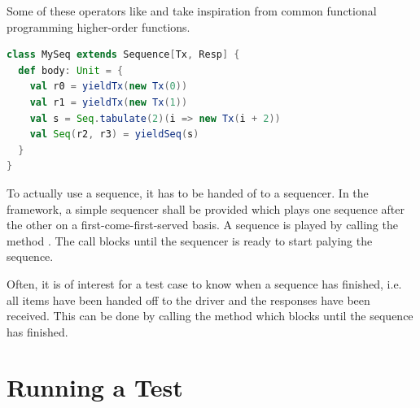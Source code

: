 Some of these operators like  and  take inspiration from common functional programming
higher-order functions.

\begin{listing}
\begin{lstlisting}[language=scala, captionpos=b, caption=Example of a sequence producing four items of type \ttt{Tx} with responses of type \ttt{Resp}.,label=lst:sequence]
class MySeq extends Sequence[Tx, Resp] {
  def body: Unit = {
    val r0 = yieldTx(new Tx(0))
    val r1 = yieldTx(new Tx(1))
    val s = Seq.tabulate(2)(i => new Tx(i + 2))
    val Seq(r2, r3) = yieldSeq(s)
  }
}
\end{lstlisting}
\end{listing}

To actually use a sequence, it has to be handed of to a sequencer. In the framework, a simple sequencer shall be
provided which plays one sequence after the other on a first-come-first-served basis. A sequence is played by calling
the method . The call blocks until the sequencer is ready to start palying the sequence.

Often, it is of interest for a test case to know when a sequence has finished, i.e. all items have been handed off to
the driver and the responses have been received. This can be done by calling the  method
which blocks until the sequence has finished.

\section{Running a Test} %

